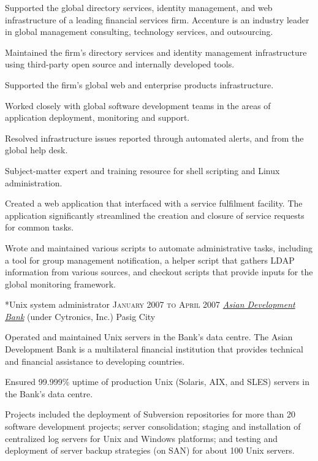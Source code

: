 \documentclass[10pt, a4paper, final]{article}
\begin{document}
\begin{section}
\begin{subsection}
    Supported the global directory services, identity management, and web infrastructure of a leading financial services firm. Accenture is an industry leader in global management consulting, technology services, and outsourcing.
    \vspace{1em}
    \begin{compactitem}
      \item Maintained the firm's directory services and identity management infrastructure using third-party open source and internally developed tools.
      \item Supported the firm's global web and enterprise products infrastructure.
      \item Worked closely with global software development teams in the areas of application deployment, monitoring and support.
      \item Resolved infrastructure issues reported through automated alerts, and from the global help desk.
      \item Subject-matter expert and training resource for shell scripting and Linux administration.
      \item Created a web application that interfaced with a service fulfilment facility. The application significantly streamlined the creation and closure of service requests for common tasks.
      \item Wrote and maintained various scripts to automate administrative tasks, including a tool for group management notification, a helper script that gathers LDAP information from various sources, and checkout scripts that provide inputs for the global monitoring framework.
      
    \end{compactitem}
  \end{subsection}
  \vspace{2em}

  \begin{subsection}*{Unix system administrator \hfill\textsc{January 2007 to April 2007}}
    \href{http://www.adb.org}{\textit{Asian Development Bank}} (under Cytronics, Inc.) \hfill Pasig City
    \vspace{1em}

    Operated and maintained Unix servers in the Bank's data centre. The Asian Development Bank is a multilateral financial institution that provides technical and financial assistance to developing countries.
    \vspace{1em}
    \begin{compactitem}
      \item Ensured 99.999\% uptime of production Unix (Solaris, AIX, and SLES) servers in the Bank's data centre.
      \item Projects included the deployment of Subversion repositories for more than 20 software development projects; server consolidation; staging and installation of centralized log servers for Unix and Windows platforms; and testing and deployment of server backup strategies (on SAN) for about 100 Unix servers.
      

\end{compactitem}
\end{subsection}
\end{section}
\end{document}
